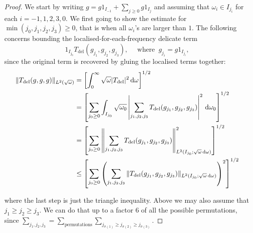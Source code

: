 \documentclass[reqno,11pt,letterpaper]{amsart}
\numberwithin{equation}{section}
\newcommand{\dd}{\, {\rm d}}
\begin{document}
\begin{proof}
 We start by writing $g = g 1_{I_{-1}} + \sum_{j \geq 0} g 1_{I_j}$ and assuming that $\omega_i \in I_{j_i}$ for each $i=-1,1,2,3,0$. We first going to show the estimate for $\min(j_0, j_1,j_2,j_3) \geq 0$, that is when all $\omega_{i}$'s are larger than $1$. 
 The following concerns bounding the localised-for-each-frequency delicate term  
        $$ 1_{I_{j_0}} T_{\text{del}}(g_{j_1},g_{j_2},g_{j_3}), \quad 
        \text{ where }\  g_{j_i} = g  1_{I_{j_i}}, 
        $$
        since the original term is recovered by gluing the localised terms together:
        \begin{align*}
             \|T_{\text{del}}(g,g,g)\|_{L^2(\sqrt{\omega})}& = 
            \left[\int_0^\infty \sqrt{\omega} |T_{\text{del}}|^2 \dd \omega \right]^{1/2}\\
            &= 
            \left[ \sum_{j_0\geq 0} \int_{I_{j_0}} \sqrt{\omega_0} \left\vert  
            \sum_{j_1, j_2, j_3} T_{\text{del}}(g_{j_1},g_{j_2},g_{j_3})
            \right\vert^2 \dd \omega_0 \right]^{1/2} \\
            &  = \left[\sum_{j_0\geq 0}
            \left\| \sum_{j_1, j_2, j_3} T_{\text{del}}(g_{j_1},g_{j_2},g_{j_3})
            \right\|_{L^2(I_{j_0};\sqrt{\omega}\dd \omega)}^2   \right]^{1/2} \\
            & \leq 
            \left[\sum_{j_0\geq 0} \left( 
            \sum_{j_1,j_2,j_3}
            \|T_{\text{del}}(g_{j_1},g_{j_2},g_{j_3})  \|_{L^2(I_{j_0};\sqrt{\omega}\dd \omega)} \right)^2 
            \right]^{1/2}
        \end{align*}
        
        where the last step is just the triangle inequality. 
        Above we may also assume that $j_1\geq j_2 \geq j_3$. We can do that up to a factor $6$ of all the possible permutations, since $\sum_{j_1,j_2,j_3} = \sum_{\text{permutations}} \sum_{j_{\sigma(1)} \geq j_{\sigma(2)} \geq j_{\sigma(3)}}$.  


\end{proof}
\end{document}

